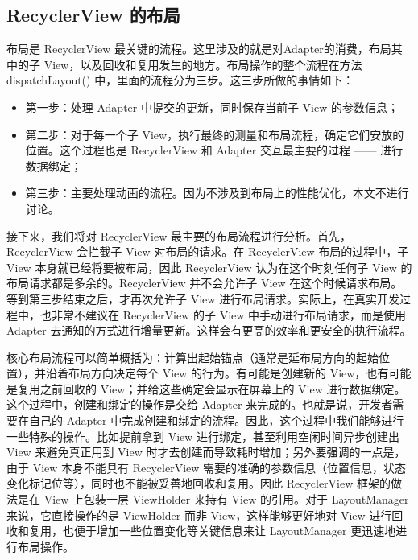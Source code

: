 \subsection{RecyclerView 的布局}

布局是 RecyclerView 最关键的流程。这里涉及的就是对Adapter的消费，布局其中的子 View，以及回收和复用发生的地方。布局操作的整个流程在方法 dispatchLayout() 中，里面的流程分为三步。这三步所做的事情如下：

\begin{itemize}
    \item 第一步：处理 Adapter 中提交的更新，同时保存当前子 View 的参数信息；
    \item 第二步：对于每一个子 View，执行最终的测量和布局流程，确定它们安放的位置。这个过程也是 RecyclerView 和 Adapter 交互最主要的过程 —— 进行数据绑定；
    \item 第三步：主要处理动画的流程。因为不涉及到布局上的性能优化，本文不进行讨论。
\end{itemize}

接下来，我们将对 RecyclerView 最主要的布局流程进行分析。首先，RecyclerView 会拦截子 View 对布局的请求。在 RecyclerView 布局的过程中，子 View 本身就已经将要被布局，因此 RecyclerView 认为在这个时刻任何子 View 的布局请求都是多余的。RecyclerView 并不会允许子 View 在这个时候请求布局。等到第三步结束之后，才再次允许子 View 进行布局请求。实际上，在真实开发过程中，也非常不建议在 RecyclerView 的子 View 中手动进行布局请求，而是使用 Adapter 去通知的方式进行增量更新。这样会有更高的效率和更安全的执行流程。

核心布局流程可以简单概括为：计算出起始锚点（通常是延布局方向的起始位置），并沿着布局方向决定每个 View 的行为。有可能是创建新的 View，也有可能是复用之前回收的 View；并给这些确定会显示在屏幕上的 View 进行数据绑定。这个过程中，创建和绑定的操作是交给 Adapter 来完成的。也就是说，开发者需要在自己的 Adapter 中完成创建和绑定的流程。因此，这个过程中我们能够进行一些特殊的操作。比如提前拿到 View 进行绑定，甚至利用空闲时间异步创建出 View 来避免真正用到 View 时才去创建而导致耗时增加；另外要强调的一点是，由于 View 本身不能具有 RecyclerView 需要的准确的参数信息（位置信息，状态变化标记位等），同时也不能被妥善地回收和复用。因此 RecyclerView 框架的做法是在 View 上包装一层 ViewHolder 来持有 View 的引用。对于 LayoutManager 来说，它直接操作的是 ViewHolder 而非 View，这样能够更好地对 View 进行回收和复用，也便于增加一些位置变化等关键信息来让 LayoutManager 更迅速地进行布局操作。


